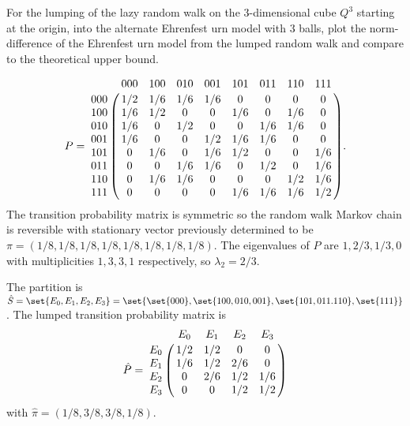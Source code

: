 \documentclass[12pt]{article}
\begin{document}
\begin{exercise}
    For the lumping of the lazy random walk on the \( 3 \)-dimensional
    cube \( Q^3 \) starting at the origin, into the alternate Ehrenfest
    urn model with \( 3 \) balls, plot the norm-difference of the
    Ehrenfest urn model from the lumped random walk and compare to the
    theoretical upper bound.
\end{exercise}
\begin{solution}
    \[
        P = \bordermatrix{ & 000 & 100 & 010 & 001 & 101 & 011 & 110 &
        111 \cr
        000 & 1/2 & 1/6 & 1/6 & 1/6 & 0 & 0 & 0 & 0 \cr
        100 & 1/6 & 1/2 & 0 & 0 & 1/6 & 0 & 1/6 & 0 \cr
        010 & 1/6 & 0 & 1/2 & 0 & 0 & 1/6 & 1/6 & 0 \cr
        001 & 1/6 & 0 & 0 & 1/2 & 1/6 & 1/6 & 0 & 0 \cr
        101 & 0 & 1/6 & 0 & 1/6 & 1/2 & 0 & 0 & 1/6 \cr
        011 & 0 & 0 & 1/6 & 1/6 & 0 & 1/2 & 0 & 1/6 \cr
        110 & 0 & 1/6 & 1/6 & 0 & 0 & 0 & 1/2 & 1/6 \cr
        111 & 0 & 0 & 0 & 0 & 1/6 & 1/6 & 1/6 & 1/2 \cr
        }.
    \] The transition probability matrix is symmetric so the random walk
    Markov chain is reversible with stationary vector previously
    determined to be \( \pi = (1/8, 1/8, 1/8, 1/8, 1/8, 1/8, 1/8, 1/8) \).
    The eigenvalues of \( P \) are \( 1, 2/3, 1/3, 0 \) with
    multiplicities \( 1,3,3,1 \) respectively, so \( \lambda_2 = 2/3 \).

    The partition is \( \hat{S} = \set{E_0, E_1, E_2, E_3} = \set{ \set{000},
    \set{100, 010, 001}, \set{101, 011.  110}, \set{111}} \). The lumped
    transition probability matrix is
    \[
        \hat{P} = \bordermatrix{ & E_0 & E_1 & E_2 & E_3 \cr
        E_0 & 1/2 & 1/2 & 0 & 0 \cr
        E_1 & 1/6 & 1/2 & 2/6 & 0 \cr
        E_2 & 0 & 2/6 & 1/2 & 1/6 \cr
        E_3 & 0 & 0 & 1/2 & 1/2 \cr
        }
    \] with \( \hat{\pi} = (1/8, 3/8, 3/8, 1/8) \).


\end{solution}
\end{document}
